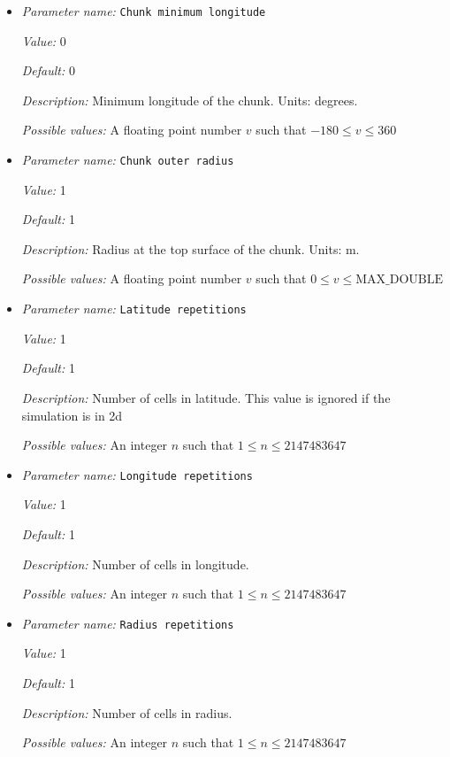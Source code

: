 \begin{itemize}
{\it Possible values:} A floating point number $v$ such that $-90 \leq v \leq 90$
\item {\it Parameter name:} {\tt Chunk minimum longitude}
\label{parameters:Geometry model/Chunk/Chunk minimum longitude}


{\it Value:} 0


{\it Default:} 0


{\it Description:} Minimum longitude of the chunk. Units: degrees.


{\it Possible values:} A floating point number $v$ such that $-180 \leq v \leq 360$
\item {\it Parameter name:} {\tt Chunk outer radius}
\label{parameters:Geometry model/Chunk/Chunk outer radius}


{\it Value:} 1


{\it Default:} 1


{\it Description:} Radius at the top surface of the chunk. Units: m.


{\it Possible values:} A floating point number $v$ such that $0 \leq v \leq \text{MAX\_DOUBLE}$
\item {\it Parameter name:} {\tt Latitude repetitions}
\label{parameters:Geometry model/Chunk/Latitude repetitions}


{\it Value:} 1


{\it Default:} 1


{\it Description:} Number of cells in latitude. This value is ignored if the simulation is in 2d


{\it Possible values:} An integer $n$ such that $1\leq n \leq 2147483647$
\item {\it Parameter name:} {\tt Longitude repetitions}
\label{parameters:Geometry model/Chunk/Longitude repetitions}


{\it Value:} 1


{\it Default:} 1


{\it Description:} Number of cells in longitude.


{\it Possible values:} An integer $n$ such that $1\leq n \leq 2147483647$
\item {\it Parameter name:} {\tt Radius repetitions}
\label{parameters:Geometry model/Chunk/Radius repetitions}


{\it Value:} 1


{\it Default:} 1


{\it Description:} Number of cells in radius.


{\it Possible values:} An integer $n$ such that $1\leq n \leq 2147483647$
\end{itemize}

